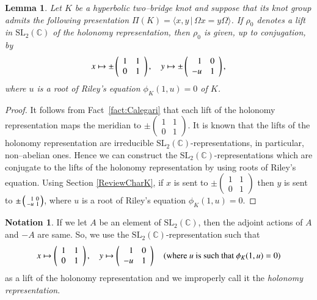 \documentclass[a4paper]{amsart}
\theoremstyle{plain}
\newtheorem{lemma}[theorem]{Lemma}%
\theoremstyle{definition}
\newtheorem*{notation*}{Notation}
\theoremstyle{remark}
\newcommand{\C}{{\mathbb C}}
\newcommand{\SL}{{\mathrm{SL}_2(\C)}}
\begin{document}
\begin{lemma}\label{L8}
Let $K$ be a hyperbolic two--bridge knot and 
suppose that its knot group admits the following presentation 
$\Pi(K)=\langle x,y \, | \, \Omega x=y \Omega\rangle$. 
If $\rho_0$ denotes a lift in $\SL$ of the holonomy representation, 
then $\rho_0$ is given, up to conjugation, {by}
\[
x \mapsto 
 \pm \left(
\begin{array}{cc}
 1 & 1 \\
 0 & 1 
\end{array}
\right)
, \quad
y \mapsto 
 \pm\left(
\begin{array}{cc}
 \hphantom{-}1 & 0 \\
 - u & 1 
\end{array}
\right),
\]
where $u$ is a root of Riley's equation $\phi_K(1, u) = 0$ of $K$.
\end{lemma}

\begin{proof}
It follows from Fact~\ref{fact:Calegari} that
each lift of the holonomy representation maps the meridian to 
$\pm \left(
\begin{smallmatrix}
1 & 1\\
0 & 1
\end{smallmatrix}
\right).$
It is known that the lifts of the holonomy representation are 
irreducible $\SL$-representations, 
in particular,  non--abelian ones.
Hence we can construct the $\SL$-representations which are conjugate to 
the lifts of the holonomy representation 
by using roots of Riley's equation.
Using Section \ref{ReviewCharK}, if $x$ is sent to $\pm \left(
\begin{smallmatrix}
1 & 1\\
0 & 1
\end{smallmatrix}
\right)$ then $y$ is sent to $\pm\left(
\begin{smallmatrix}
 \hphantom{-}1 & 0 \\
 - u & 1 
\end{smallmatrix}\right)$, where $u$ is a root of Riley's equation $\phi_K(1,u) = 0$.
\end{proof}

\begin{notation*}
If we let $A$ be an element of $\SL$, 
then the adjoint actions of $A$ and $-A$ are same.
So, we use the $\SL$-representation such that 
$$
x \mapsto 
\left(
\begin{array}{cc}
  1 & 1 \\
  0 & 1 
\end{array}
\right)
, \quad
y \mapsto 
\left(
\begin{array}{cc}
 \hphantom{-}1 & 0 \\
-u &  1 
\end{array}
\right) \quad (\text{where } u \text{ is such that } \phi_K(1, u) = 0)
$$
as a lift of the holonomy representation and we improperly call it the \emph{holonomy representation}. 
\end{notation*}
\end{document}
